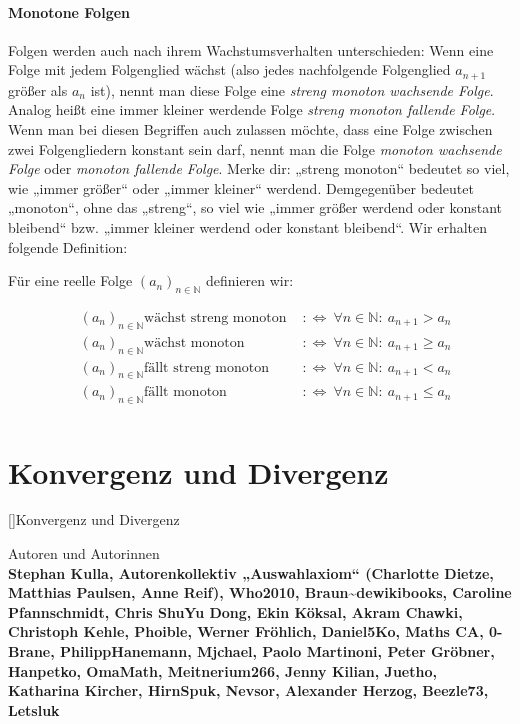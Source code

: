 \documentclass[fontsize=9pt,
               parskip=half-,
               DIV=14,
               listof=chapterentry,
               tocflat]{scrbook}
\newenvironment{authors}{\par\vspace*{\fill}\color{white}Autoren und
Autorinnen\\\bfseries}{\clearpage}
\begin{document}
\subsection{Monotone Folgen}

Folgen werden auch nach ihrem Wachstumsverhalten unterschieden: Wenn eine Folge mit jedem Folgenglied wächst (also jedes nachfolgende Folgenglied $a_{n+1}$ größer als $a_{n}$ ist), nennt man diese Folge eine \emph{streng monoton wachsende Folge}. Analog heißt eine immer kleiner werdende Folge \emph{streng monoton fallende Folge}. Wenn man bei diesen Begriffen auch zulassen möchte, dass eine Folge zwischen zwei Folgengliedern konstant sein darf, nennt man die Folge \emph{monoton wachsende Folge} oder \emph{monoton fallende Folge}. Merke dir: „streng monoton“ bedeutet so viel, wie „immer größer“ oder „immer kleiner“ werdend. Demgegenüber bedeutet „monoton“, ohne das „streng“, so viel wie „immer größer werdend oder konstant bleibend“ bzw. „immer kleiner werdend oder konstant bleibend“. Wir erhalten folgende Definition:

\begin{definition*}
Für eine reelle Folge $\left(a_{n}\right)_{n\in \mathbb {N} }$ definieren wir:

\begin{align*}
&\left(a_{n}\right)_{n\in \mathbb {N} }{\text{wächst streng monoton }}&:\iff \ \forall n\in \mathbb {N} :\ a_{n+1}>a_{n}\\&\left(a_{n}\right)_{n\in \mathbb {N} }{\text{wächst monoton }}&:\iff \ \forall n\in \mathbb {N} :\ a_{n+1}\geq a_{n}\\&\left(a_{n}\right)_{n\in \mathbb {N} }{\text{fällt streng monoton }}&:\iff \ \forall n\in \mathbb {N} :\ a_{n+1}<a_{n}\\&\left(a_{n}\right)_{n\in \mathbb {N} }{\text{fällt monoton }}&:\iff \ \forall n\in \mathbb {N} :\ a_{n+1}\leq a_{n}\\
\end{align*}

\end{definition*}

\part{Konvergenz und Divergenz}

[]{Konvergenz und Divergenz}\begin{authors}
Stephan Kulla, Autorenkollektiv „Auswahlaxiom“ (Charlotte Dietze, Matthias Paulsen, Anne Reif), Who2010, Braun\textasciitilde{}dewikibooks, Caroline Pfannschmidt, Chris ShuYu Dong, Ekin Köksal, Akram Chawki, Christoph Kehle, Phoible, Werner Fröhlich, Daniel5Ko, Maths CA, 0-Brane, PhilippHanemann, Mjchael, Paolo Martinoni, Peter Gröbner, Hanpetko, OmaMath, Meitnerium266, Jenny Kilian, Juetho, Katharina Kircher, HirnSpuk, Nevsor, Alexander Herzog, Beezle73, Letsluk\end{authors}
\end{document}
